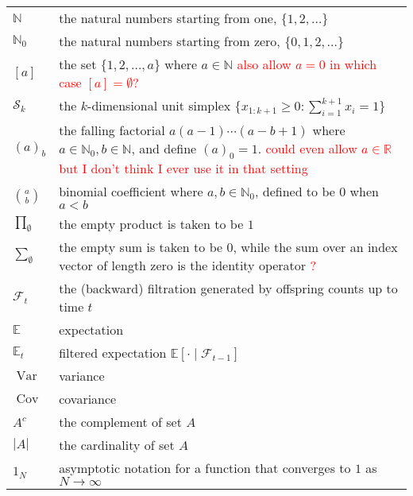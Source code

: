 \documentclass[oneside]{scrbook} %
\newcommand{\seb}[1]{\xspace\textcolor{red}{#1}\xspace} %
\theoremstyle{definition}
\newcommand{\E}{\mathbb{E}}
\newcommand{\Et}{\mathbb{E}_t}
\newcommand{\V}{\operatorname{Var}}
\newcommand{\Cov}{\operatorname{Cov}}
\newcommand{\ON}{1_N}
\newcommand{\1}[1]{\mathbbm{1}_{#1}} %
\begin{document}
\begin{tabular}{p{} p{}}
$\mathbb{N}$ & the natural numbers starting from one, $\{1,2,\dots \}$ \\
$\mathbb{N}_0$ & the natural numbers starting from zero, $\{0,1,2,\dots \}$ \\
$[a]$ & the set $\{1,2,\dots,a\}$ where $a\in\mathbb{N}$ \seb{also allow $a=0$ in which case $[a] = \emptyset$?} \\
$\mathcal{S}_k$ & the $k$-dimensional unit simplex $\{ x_{1:k+1} \geq 0 : \sum_{i=1}^{k+1} x_i = 1 \}$ \\
$(a)_b$ & the falling factorial $a (a-1) \cdots (a-b+1)$ 
    where $a \in \mathbb{N}_0, b \in \mathbb{N}$, and define $(a)_0 = 1$. \seb{could even allow $a\in\mathbb{R}$ but I don't think I ever use it in that setting} \\
$\binom{a}{b}$ & binomial coefficient where $a,b \in \mathbb{N}_0$, defined to be $0$ when $a<b$ \\
$\prod_{\emptyset}$ & the empty product is taken to be $1$ \\
$\sum_{\emptyset}$ & the empty sum is taken to be $0$, while the sum over
    an index vector of length zero is the identity operator \seb{?} \\
$\mathcal{F}_{t}$ & the (backward) filtration generated by offspring counts 
    up to time $t$ \\
$\E$ & expectation \\
$\Et$ & filtered expectation $\E[ \cdot \mid \mathcal{F}_{t-1}]$\\
$\V$ & variance \\
$\Cov$ & covariance \\
$A^c$ & the complement of set $A$\\
$|A|$ & the cardinality of set $A$\\
$\ON$ & asymptotic notation for a function that converges to $1$ as $N\to\infty$ \\
\end{tabular}


\mainmatter











\backmatter


\printbibliography
\end{document}
